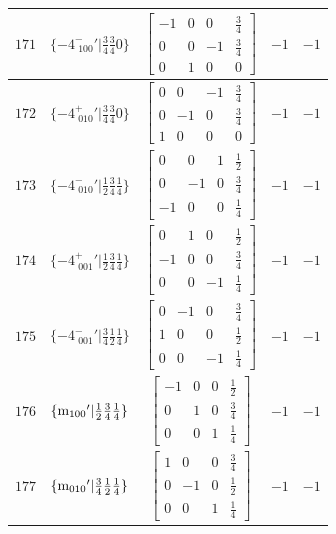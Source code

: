 \documentclass[fleqn,8pt]{jsarticle}
\begin{document}
\begin{longtable}{ccccc}
$ 171 $ & $ \{-4^{-}_{\,\,100}{}'|\frac{3}{4} \frac{3}{4} 0\} $ & $ \begin{bmatrix} -1 & 0 & 0 & \frac{3}{4} \\ 0 & 0 & -1 & \frac{3}{4} \\ 0 & 1 & 0 & 0 \end{bmatrix} $ & $ -1 $ & $ -1 $ \\ \hline
$ 172 $ & $ \{-4^{+}_{\,\,010}{}'|\frac{3}{4} \frac{3}{4} 0\} $ & $ \begin{bmatrix} 0 & 0 & -1 & \frac{3}{4} \\ 0 & -1 & 0 & \frac{3}{4} \\ 1 & 0 & 0 & 0 \end{bmatrix} $ & $ -1 $ & $ -1 $ \\ \hline
$ 173 $ & $ \{-4^{-}_{\,\,010}{}'|\frac{1}{2} \frac{3}{4} \frac{1}{4}\} $ & $ \begin{bmatrix} 0 & 0 & 1 & \frac{1}{2} \\ 0 & -1 & 0 & \frac{3}{4} \\ -1 & 0 & 0 & \frac{1}{4} \end{bmatrix} $ & $ -1 $ & $ -1 $ \\ \hline
$ 174 $ & $ \{-4^{+}_{\,\,001}{}'|\frac{1}{2} \frac{3}{4} \frac{1}{4}\} $ & $ \begin{bmatrix} 0 & 1 & 0 & \frac{1}{2} \\ -1 & 0 & 0 & \frac{3}{4} \\ 0 & 0 & -1 & \frac{1}{4} \end{bmatrix} $ & $ -1 $ & $ -1 $ \\ \hline
$ 175 $ & $ \{-4^{-}_{\,\,001}{}'|\frac{3}{4} \frac{1}{2} \frac{1}{4}\} $ & $ \begin{bmatrix} 0 & -1 & 0 & \frac{3}{4} \\ 1 & 0 & 0 & \frac{1}{2} \\ 0 & 0 & -1 & \frac{1}{4} \end{bmatrix} $ & $ -1 $ & $ -1 $ \\ \hline
$ 176 $ & $ \{{\rm m}_{100}{}'|\frac{1}{2} \frac{3}{4} \frac{1}{4}\} $ & $ \begin{bmatrix} -1 & 0 & 0 & \frac{1}{2} \\ 0 & 1 & 0 & \frac{3}{4} \\ 0 & 0 & 1 & \frac{1}{4} \end{bmatrix} $ & $ -1 $ & $ -1 $ \\ \hline
$ 177 $ & $ \{{\rm m}_{010}{}'|\frac{3}{4} \frac{1}{2} \frac{1}{4}\} $ & $ \begin{bmatrix} 1 & 0 & 0 & \frac{3}{4} \\ 0 & -1 & 0 & \frac{1}{2} \\ 0 & 0 & 1 & \frac{1}{4} \end{bmatrix} $ & $ -1 $ & $ -1 $ \\ \hline

\end{longtable}
\end{document}
